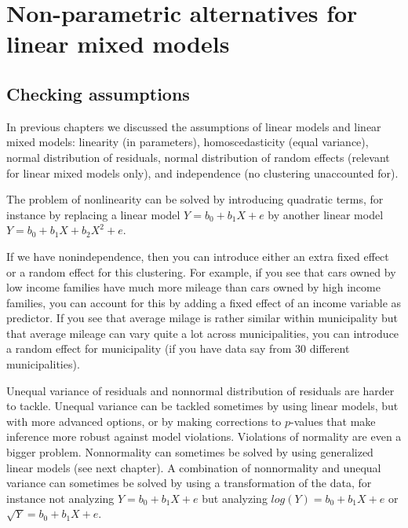\documentclass[]{book}\usepackage[]{graphicx}\usepackage[]{color}
\begin{document}
\chapter{Non-parametric alternatives for linear mixed models}\label{chap:nonpar2}


\section{Checking assumptions}

In previous chapters we discussed the assumptions of linear models and linear mixed models: linearity (in parameters), homoscedasticity (equal variance), normal distribution of residuals, normal distribution of random effects (relevant for linear mixed models only), and independence (no clustering unaccounted for). 




The problem of nonlinearity can be solved by introducing quadratic terms, for instance by replacing a linear model $Y = b_0 + b_1 X + e$ by another linear model $Y = b_0 + b_1 X + b_2 X^2 + e$.

If we have nonindependence, then you can introduce either an extra fixed effect or a random effect for this clustering. For example, if you see that cars owned by low income families have much more mileage than cars owned by high income families, you can account for this by adding a fixed effect of an income variable as predictor. If you see that average milage is rather similar within municipality but that average mileage can vary quite a lot across municipalities, you can introduce a random effect for municipality (if you have data say from 30 different municipalities). 

Unequal variance of residuals and nonnormal distribution of residuals are harder to tackle. Unequal variance can be tackled sometimes by using linear models, but with more advanced options, or by making corrections to $p$-values that make inference more robust against model violations. Violations of normality are even a bigger problem. Nonnormality can sometimes be solved by using generalized linear models (see next chapter). A combination of nonnormality and unequal variance can sometimes be solved by using a transformation of the data, for instance not analyzing $Y = b_0 + b_1 X + e$ but analyzing $log(Y)=  b_0 + b_1 X + e$ or $\sqrt{Y}=  b_0 + b_1 X + e$.
\end{document}

